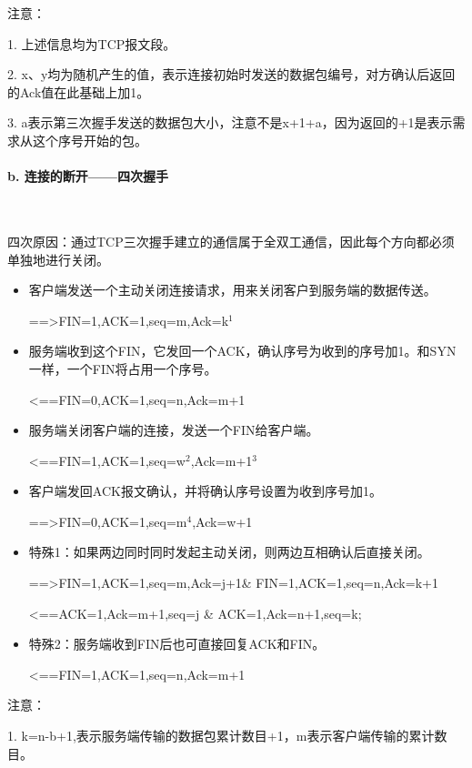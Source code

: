 \documentclass[UTF8]{article}%
\begin{document}
注意：

1. 上述信息均为TCP报文段。

2. x、y均为随机产生的值，表示连接初始时发送的数据包编号，对方确认后返回的Ack值在此基础上加1。

3. a表示第三次握手发送的数据包大小，注意不是x+1+a，因为返回的+1是表示需求从这个序号开始的包。

\paragraph{b. 连接的断开——四次握手}~{}

四次原因：通过TCP三次握手建立的通信属于全双工通信，因此每个方向都必须单独地进行关闭。

\begin{itemize}
    \item 客户端发送一个主动关闭连接请求，用来关闭客户到服务端的数据传送。

        ==>FIN=1,ACK=1,seq=m,Ack=k$^1$

    \item 服务端收到这个FIN，它发回一个ACK，确认序号为收到的序号加1。和SYN一样，一个FIN将占用一个序号。

        <==FIN=0,ACK=1,seq=n,Ack=m+1

    \item 服务端关闭客户端的连接，发送一个FIN给客户端。
    
        <==FIN=1,ACK=1,seq=w$^2$,Ack=m+1$^3$

    \item 客户端发回ACK报文确认，并将确认序号设置为收到序号加1。
    
        ==>FIN=0,ACK=1,seq=m$^4$,Ack=w+1

    \item 特殊1：如果两边同时同时发起主动关闭，则两边互相确认后直接关闭。
    
        ==>FIN=1,ACK=1,seq=m,Ack=j+1\& FIN=1,ACK=1,seq=n,Ack=k+1

        <==ACK=1,Ack=m+1,seq=j \& ACK=1,Ack=n+1,seq=k;

    \item 特殊2：服务端收到FIN后也可直接回复ACK和FIN。
    
        <==FIN=1,ACK=1,seq=n,Ack=m+1
        
\end{itemize}

注意：

1. k=n-b+1,表示服务端传输的数据包累计数目+1，m表示客户端传输的累计数目。
\end{document}

